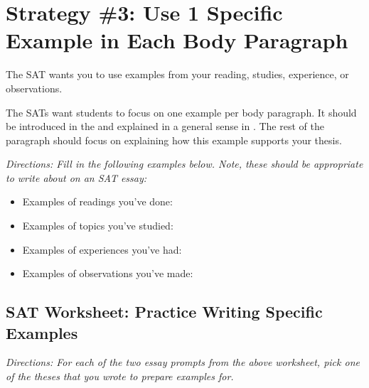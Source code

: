 \section{Strategy \#3: Use 1 Specific Example in Each Body Paragraph}

The SAT wants you to use examples from your reading, studies, experience, or observations.

The SATs want students to focus on one example per body paragraph. It should be introduced in \underline{\hspace{2in}} the and explained in a general sense in \underline{\hspace{2in}}. The rest of the paragraph should focus on explaining how this example supports your thesis.

\textit{Directions: Fill in the following examples below. Note, these should be appropriate to write about on an SAT essay:}

\begin{itemize}
\item Examples of readings you've done: \hrulefill
\noindent\makebox[\linewidth]{\rule{\paperwidth}{0.4pt}}

\item Examples of topics you've studied: \hrulefill
\noindent\makebox[\linewidth]{\rule{\paperwidth}{0.4pt}}

\item Examples of experiences you've had: \hrulefill
\noindent\makebox[\linewidth]{\rule{\paperwidth}{0.4pt}}

\item Examples of observations you've made: \hrulefill
\noindent\makebox[\linewidth]{\rule{\paperwidth}{0.4pt}}

\end{itemize} 

\subsection{SAT Worksheet: Practice Writing Specific Examples}

\textit{Directions: For each of the two essay prompts from the above worksheet, pick one of the theses
that you wrote to prepare examples for.}

